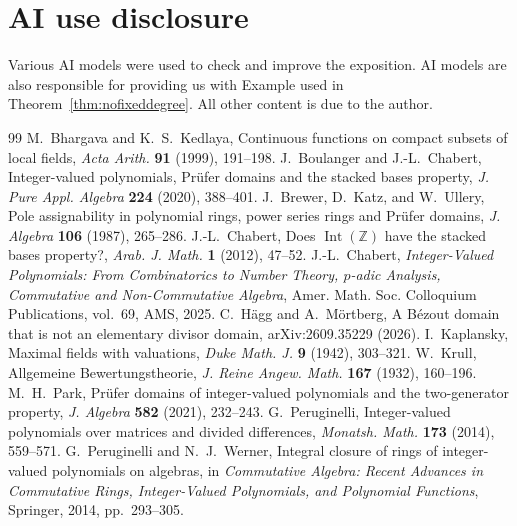 \documentclass[11pt]{amsart}
\theoremstyle{definition}
\theoremstyle{remark}
\newcommand{\Int}{\operatorname{Int}}
\begin{document}
\section{AI use disclosure}
Various AI models were used to check and improve the exposition. AI models are also responsible for providing us with Example used in Theorem~\ref{thm:nofixeddegree}. All other content is due to the author.



\begin{thebibliography}{99}
M.~Bhargava and K.~S.~Kedlaya,
Continuous functions on compact subsets of local fields,
\emph{Acta Arith.} \textbf{91} (1999), 191--198.
J.~Boulanger and J.-L.~Chabert,
Integer-valued polynomials, Pr\"ufer domains and the stacked bases property,
\emph{J. Pure Appl. Algebra} \textbf{224} (2020), 388--401.
J.~Brewer, D.~Katz, and W.~Ullery,
Pole assignability in polynomial rings, power series rings and Pr\"ufer domains,
\emph{J. Algebra} \textbf{106} (1987), 265--286.
J.-L.~Chabert, Does $\Int(\mathbb Z)$ have the stacked bases property?,
\emph{Arab. J. Math.} \textbf{1} (2012), 47--52.
J.-L.~Chabert, \emph{Integer-Valued Polynomials: From Combinatorics to Number
Theory, $p$-adic Analysis, Commutative and Non-Commutative Algebra},
Amer. Math. Soc. Colloquium Publications, vol.~69, AMS, 2025.
C.~H\"agg and A.~M\"ortberg, A B\'ezout domain that is not an elementary
divisor domain, arXiv:2609.35229 (2026).
I.~Kaplansky, Maximal fields with valuations,
\emph{Duke Math. J.} \textbf{9} (1942), 303--321.
W.~Krull, Allgemeine Bewertungstheorie,
\emph{J. Reine Angew. Math.} \textbf{167} (1932), 160--196.
M.~H.~Park, Pr\"ufer domains of integer-valued polynomials and the
two-generator property, \emph{J. Algebra} \textbf{582} (2021), 232--243.
G.~Peruginelli, Integer-valued polynomials over matrices and divided
differences, \emph{Monatsh. Math.} \textbf{173} (2014), 559--571.
G.~Peruginelli and N.~J.~Werner, Integral closure of rings of
integer-valued polynomials on algebras,
in \emph{Commutative Algebra: Recent Advances in Commutative Rings, Integer-Valued Polynomials, and Polynomial Functions}, Springer, 2014, pp.~293--305.
\end{thebibliography}
\end{document}

